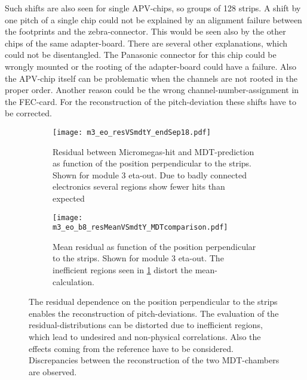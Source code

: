 \documentclass[
twoside,            %
BCOR1.4cm,          %
10pt,               %
headings=normal,    %
headsepline,        %
clearplainpage,		%
final,              %
div=14,
open=right,
bibliography=toc
]{scrreprt}
\begin{document}
Such shifts are also seen for single APV-chips, so groups of 128 strips.
A shift by one pitch of a single chip could not be explained by an alignment failure between the footprints and the zebra-connector.
This would be seen also by the other chips of the same adapter-board.
There are several other explanations, which could not be disentangled.
The Panasonic connector for this chip could be wrongly mounted or the rooting of the adapter-board could have a failure.
Also the APV-chip itself can be problematic when the channels are not rooted in the proper order.
Another reason could be the wrong channel-number-assignment in the FEC-card.
For the reconstruction of the pitch-deviation these shifts have to be corrected.

\begin{figure}[!h]
	\begin{subfigure}[b]{0.48\textwidth}
		\centering
		\texttt{[image: m3\_eo\_resVSmdtY\_endSep18.pdf]}
		\caption{
			Residual between Micromegas-hit and MDT-prediction as function of the position perpendicular to the strips.
			Shown for module 3 eta-out.
			Due to badly connected electronics several regions show fewer hits than expected
		}
		\label{m3_eo_resVSmdtY_endSep18} 
	\end{subfigure}
	\hfill
	\begin{subfigure}[b]{0.48\textwidth}
		\centering
		\texttt{[image: m3\_eo\_b8\_resMeanVSmdtY\_MDTcomparison.pdf]}
		\caption{
			Mean residual as function of the position perpendicular to the strips.
			Shown for module 3 eta-out.
			The inefficient regions seen in \ref{m3_eo_resVSmdtY_endSep18} distort the mean-calculation.
		}
		\label{m3_eo_b8_resMeanVSmdtY_MDTcomparison} 
	\end{subfigure}
	\vspace{-2mm}
	\caption{
		The residual dependence on the position perpendicular to the strips enables the reconstruction of pitch-deviations.
		The evaluation of the residual-distributions can be distorted due to inefficient regions, which lead to undesired and non-physical correlations. 
		Also the effects coming from the reference have to be considered.
		Discrepancies between the reconstruction of the two MDT-chambers are observed.
	}
	\label{m3_eo_residualVSmdtY_endSep18} 
\end{figure}
\end{document}

